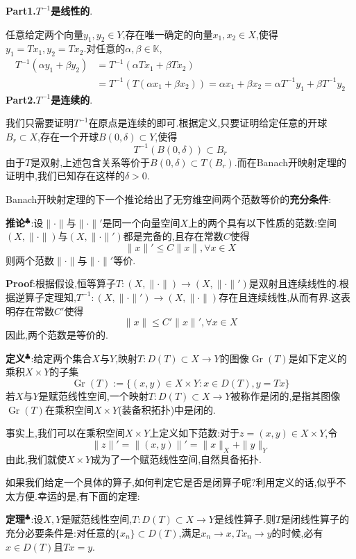\textbf{Part1.$T^{-1}$是线性的}.\par
任意给定两个向量$y_1,y_2\in Y$,存在唯一确定的向量$x_1,x_2\in X$,使得$y_1=Tx_1,y_2=Tx_2$.对任意的$\alpha,\beta\in\mathbb{K}$,
$$
\begin{aligned}
    T^{-1}(\alpha y_1+\beta y_2) &= T^{-1}(\alpha Tx_1+\beta Tx_2)\\
                                 &= T^{-1}(T(\alpha x_1+\beta x_2))=\alpha x_1+\beta x_2=\alpha T^{-1}y_1+\beta T^{-1}y_2
\end{aligned}
$$
\qquad \textbf{Part2.$T^{-1}$是连续的}.\par
我们只需要证明$T^{-1}$在原点是连续的即可.根据定义,只要证明给定任意的开球$B_r\subset X$,存在一个开球$B(0,\delta)\subset Y$,使得
$$
T^{-1}(B(0,\delta))\subset B_r
$$
由于$T$是双射,上述包含关系等价于$B(0,\delta)\subset T(B_r)$.而在Banach开映射定理的证明中,我们已知存在这样的$\delta>0$.\par
Banach开映射定理的下一个推论给出了无穷维空间两个范数等价的\textbf{充分条件}:\par
\textbf{推论}$^\clubsuit $:设$\|\cdot\|$与$\|\cdot\|'$是同一个向量空间$X$上的两个具有以下性质的范数:空间$(X,\|\cdot\|)$与$(X,\|\cdot\|')$都是完备的,且存在常数$C$使得
$$
\|x\|'\leqslant C\|x\|,\forall x\in X
$$
则两个范数$\|\cdot\|$与$\|\cdot\|'$等价.\par
\textbf{Proof}:根据假设,恒等算子$T:(X,\|\cdot\|)\to (X,\|\cdot\|')$是双射且连续线性的.根据逆算子定理知,$T^{-1}:(X,\|\cdot\|')\to (X,\|\cdot\|)$存在且连续线性,从而有界.这表明存在常数$C'$使得
$$
\|x\|\leqslant C'\|x\|',\forall x\in X
$$
因此,两个范数是等价的.\par
\textbf{定义}$^\clubsuit $:给定两个集合$X$与$Y$,映射$T:D(T)\subset X\to Y$的图像$\operatorname{Gr}(T)$是如下定义的乘积$X\times Y$的子集
$$
\operatorname{Gr}(T):=\{(x,y)\in X\times Y:x\in D(T),y=Tx\}
$$
\qquad 若$X$与$Y$是赋范线性空间,一个映射$T:D(T)\subset X\to Y$被称作是闭的,是指其图像$\operatorname{Gr}(T)$在乘积空间$X\times Y$(装备积拓扑)中是闭的.\par
事实上,我们可以在乘积空间$X\times Y$上定义如下范数:对于$z=(x,y)\in X\times Y$,令
$$
\|z\|'=\|(x,y)\|'=\|x\|_{X}+\|y\|_{Y}
$$
由此,我们就使$X\times Y$成为了一个赋范线性空间,自然具备拓扑.\par
如果我们给定一个具体的算子,如何判定它是否是闭算子呢?利用定义的话,似乎不太方便.幸运的是,有下面的定理:\par
\textbf{定理}$^\clubsuit $:设$X,Y$是赋范线性空间,$T:D(T)\subset X\to Y$是线性算子.则$T$是闭线性算子的充分必要条件是:对任意的$\{x_n\}\subset D(T)$,满足$x_n\to x,Tx_n\to y$的时候,必有$x\in D(T)$且$Tx=y$.\par
